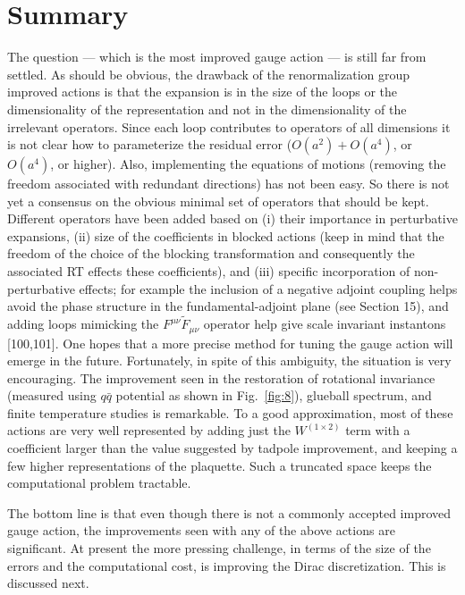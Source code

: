 \section{Summary}

The question --- which is the most improved gauge action --- is still
far from settled.  As should be obvious, the drawback of the
renormalization group improved actions is that the expansion is in the
size of the loops or the dimensionality of the representation and not
in the dimensionality of the irrelevant operators.  Since each loop
contributes to operators of all dimensions it is not clear how to
parameterize the residual error ($O(a^2) + O(a^4)$, or $O(a^4)$, or
higher).  Also, implementing the equations of motions (removing the
freedom associated with redundant directions) has not been easy.  So
there is not yet a consensus on the obvious minimal set of operators
that should be kept.  Different operators have been added based on (i)
their importance in perturbative expansions, (ii) size of the
coefficients in blocked actions (keep in mind that the freedom of the
choice of the blocking transformation and consequently the associated
RT effects these coefficients), and (iii) specific incorporation of
non-perturbative effects; for example the inclusion of a negative
adjoint coupling helps avoid the phase structure in the
fundamental-adjoint plane (see Section 15), and adding loops mimicking
the $F^{\mu\nu}\tilde F_{\mu\nu}$ operator help give scale invariant
instantons [100,101].  One hopes that a more precise method for tuning
the gauge action will emerge in the future.  Fortunately, in spite of
this ambiguity, the situation is very encouraging.  The improvement
seen in the restoration of rotational invariance (measured using $q\bar
q$ potential as shown in Fig.~\ref{fig:8}), glueball spectrum, and
finite temperature studies is remarkable.  To a good approximation,
most of these actions are very well represented by adding just the
$W^{(1\times2)}$ term with a coefficient larger than the value suggested
by tadpole improvement, and keeping a few higher representations of the
plaquette.  Such a truncated space keeps the computational problem
tractable.

The bottom line is that even though there is not a commonly accepted
improved gauge action, the improvements seen with any of the above
actions are significant.  At present the more pressing challenge, in
terms of the size of the errors and the computational cost, is improving
the Dirac discretization.  This is discussed next.
